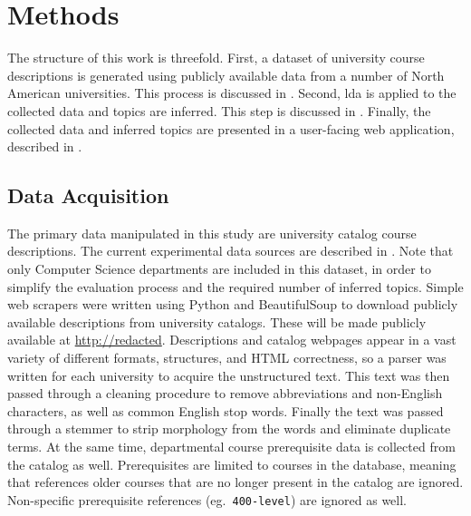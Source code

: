 \section{Methods}
\label{sec:methods}


The structure of this work is threefold.
First, a dataset of university course descriptions is generated using publicly available data from a number of North American universities.
This process is discussed in .
Second, \ac{lda} is applied to the collected data and topics are inferred.
This step is discussed in .
Finally, the collected data and inferred topics are presented in a user-facing web application, described in .


\subsection{Data Acquisition}
\label{sec:data-acquisition}


The primary data manipulated in this study are university catalog course descriptions.
The current experimental data sources are described in .
Note that only Computer Science departments are included in this dataset, in order to simplify the evaluation process and the required number of inferred topics.
Simple web scrapers were written using Python and BeautifulSoup to download publicly available descriptions from university catalogs.
These will be made publicly available at
\url{http://redacted}.
Descriptions and catalog webpages appear in a vast variety of different formats, structures, and HTML correctness, so a parser was written for each university to acquire the unstructured text.
This text was then passed through a cleaning procedure to remove abbreviations and non-English characters, as well as common English stop words.
Finally the text was passed through a stemmer to strip morphology from the words and eliminate duplicate terms.
At the same time, departmental course prerequisite data is collected from the catalog as well.
Prerequisites are limited to courses in the database, meaning that references older courses that are no longer present in the catalog are ignored.
Non-specific prerequisite references (eg.\ \texttt{400-level}) are ignored as well.

